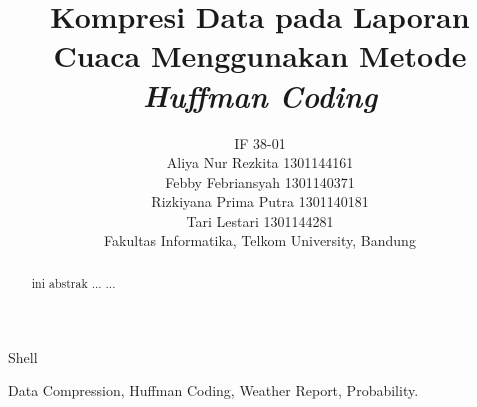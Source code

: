 \documentclass[journal]{IEEEtran}
\begin{document}
	
\title{Kompresi Data pada Laporan Cuaca Menggunakan Metode \textit{Huffman Coding}}

\author{
	IF 38-01\\
	\vspace{1mm}
	Aliya Nur Rezkita\hspace{1.05cm} 1301144161\\
	Febby Febriansyah\hspace{1cm} 1301140371\\	
	Rizkiyana Prima Putra\hspace{0.4cm} 1301140181\\
	Tari Lestari\hspace{2.15cm} 1301144281\\
	Fakultas Informatika, Telkom University, Bandung
}

%
{Shell}

\maketitle

\begin{abstract}
	ini abstrak ... ...
\end{abstract}

\begin{IEEEkeywords}
Data Compression, Huffman Coding, Weather Report, Probability.
\end{IEEEkeywords}
\end{document}

